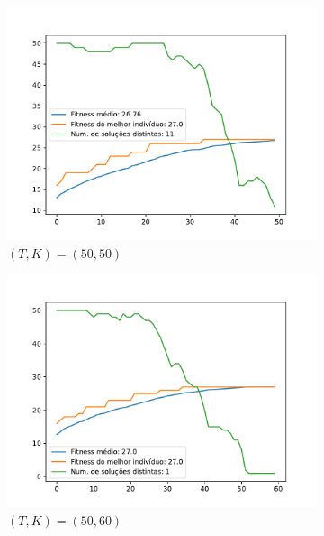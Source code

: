 \documentclass[11pt,a4paper]{article}
\begin{document}
\begin{figure}[!hb]
	\begin{subfigure}[b]{0.33\textwidth}
		\centering
		\includegraphics[width=\textwidth]{teste6_50_50.pdf}
		\caption{$(T,K)=(50,50)$}
	\end{subfigure}%
	\begin{subfigure}[b]{0.33\textwidth}
		\centering
		\includegraphics[width=\textwidth]{teste6_50_60.pdf}
		\caption{$(T,K)=(50,60)$}
	\end{subfigure}%
		\begin{subfigure}[b]{0.33\textwidth}
		\centering

\end{subfigure}
\end{figure}
\end{document}
